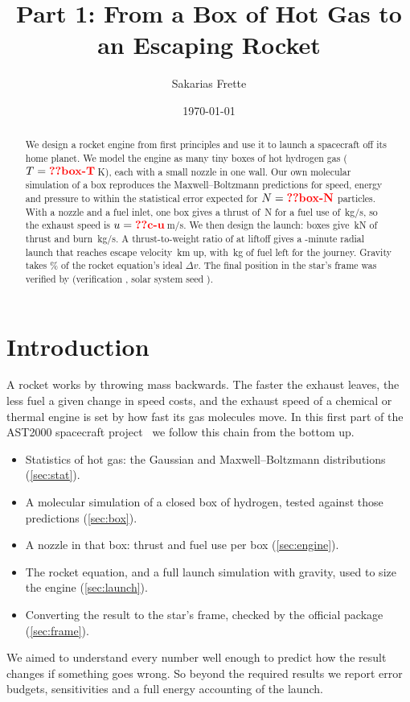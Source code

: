 \documentclass[aps,prd,twocolumn,nofootinbib,floatfix,superscriptaddress]{revtex4-2}
\begin{document}
\title{Part 1: From a Box of Hot Gas to an Escaping Rocket}
\author{Sakarias Frette}
\date{\today}

\begin{abstract}
We design a rocket engine from first principles and use it to launch a spacecraft off its home planet.
We model the engine as many tiny boxes of hot hydrogen gas ($T=\val{box-T}\,$K), each with a small nozzle in one wall.
Our own molecular simulation of a box reproduces the Maxwell--Boltzmann predictions for speed, energy and pressure to within the statistical error expected for $N=\val{box-N}$ particles.
With a nozzle and a fuel inlet, one box gives a thrust of \,N for a fuel use of \,kg/s, so the exhaust speed is $u=\val{c-u}$\,m/s.
We then design the launch:  boxes give \,kN of thrust and burn \,kg/s.
A thrust-to-weight ratio of  at liftoff gives a -minute radial launch that reaches escape velocity \,km up, with \,kg of fuel left for the journey.
Gravity takes \% of the rocket equation's ideal $\Delta v$.
The final position in the star's frame was verified by  (verification , solar system seed ).
\end{abstract}

\maketitle

\section{Introduction}
A rocket works by throwing mass backwards.
The faster the exhaust leaves, the less fuel a given change in speed costs, and the exhaust speed of a chemical or thermal engine is set by how fast its gas molecules move.
In this first part of the AST2000 spacecraft project~\cite{ast2000project} we follow this chain from the bottom up.
\begin{itemize}
\item Statistics of hot gas: the Gaussian and Maxwell--Boltzmann distributions (\cref{sec:stat}).
\item A molecular simulation of a closed box of hydrogen, tested against those predictions (\cref{sec:box}).
\item A nozzle in that box: thrust and fuel use per box (\cref{sec:engine}).
\item The rocket equation, and a full launch simulation with gravity, used to size the engine (\cref{sec:launch}).
\item Converting the result to the star's frame, checked by the official  package~\cite{ast2000tools} (\cref{sec:frame}).
\end{itemize}
We aimed to understand every number well enough to predict how the result changes if something goes wrong.
So beyond the required results we report error budgets, sensitivities and a full energy accounting of the launch.
\end{document}
